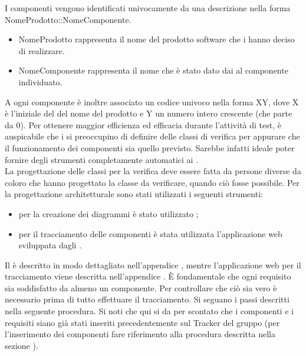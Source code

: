 				 \label{sec:ClassificareComponenti}
					I componenti vengono identificati univocamente da una descrizione nella forma NomeProdotto::NomeComponente.
					\begin{itemize}
						\item NomeProdotto rappresenta il nome del prodotto software che i  hanno deciso di realizzare.
						\item NomeComponente rappresenta il nome che è stato dato dai  al componente individuato.
					\end{itemize}
					A ogni componente è inoltre associato un codice univoco nella forma XY, dove X è l'iniziale del del nome del prodotto e Y un numero intero crescente (che parte da 0).
				 \label{sec:TestIntegrazione}
					Per ottenere maggior efficienza ed efficacia durante l'attività di test, è auspicabile che i  si preoccupino di definire delle classi di verifica per appurare che il funzionamento dei componenti sia quello previsto. Sarebbe infatti ideale poter fornire degli strumenti completamente automatici ai .\\
					La progettazione delle classi per la verifica deve essere fatta da persone diverse da coloro che hanno progettato la classe da verificare, quando ciò fosse possibile.
				Per la progettazione architetturale sono stati utilizzati i seguenti strumenti:
				\begin{itemize}
					\item per la creazione dei diagrammi  è stato utilizzato ;
					\item per il tracciamento delle componenti è stata utilizzata l'applicazione web sviluppata dagli .
				\end{itemize}
				Il   è descritto in modo dettagliato nell'appendice , mentre l'applicazione web per il tracciamento viene descritta nell'appendice .
				 \label{sec:ProgTracCompReq}
					È fondamentale che ogni requisito sia soddisfatto da almeno un componente. Per controllare che ciò sia vero è necessario prima di tutto effettuare il tracciamento. Si seguano i passi descritti nella seguente procedura. Si noti che qui si da per scontato che i componenti e i requisiti siano già stati inseriti precedentemente sul Tracker del gruppo (per l'inserimento dei componenti fare riferimento alla procedura descritta nella sezione ).
